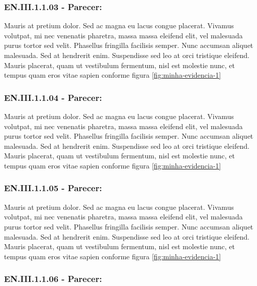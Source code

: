 \documentclass[12pt, a4paper]{article}
\begin{document}
    \subsubsection*{EN.III.1.1.03 - Parecer:}
    
    Mauris at pretium dolor. Sed ac magna eu lacus congue placerat. Vivamus volutpat, mi nec venenatis pharetra, massa massa eleifend elit, vel malesuada purus tortor sed velit. Phasellus fringilla facilisis semper. Nunc accumsan aliquet malesuada. Sed at hendrerit enim. Suspendisse sed leo at orci tristique eleifend. Mauris placerat, quam ut vestibulum fermentum, nisl est molestie nunc, et tempus quam eros vitae sapien  conforme figura \ref{fig:minha-evidencia-1}
    
    \vspace{1cm} 
    
    \subsubsection*{EN.III.1.1.04 - Parecer:}
    
    Mauris at pretium dolor. Sed ac magna eu lacus congue placerat. Vivamus volutpat, mi nec venenatis pharetra, massa massa eleifend elit, vel malesuada purus tortor sed velit. Phasellus fringilla facilisis semper. Nunc accumsan aliquet malesuada. Sed at hendrerit enim. Suspendisse sed leo at orci tristique eleifend. Mauris placerat, quam ut vestibulum fermentum, nisl est molestie nunc, et tempus quam eros vitae sapien  conforme figura \ref{fig:minha-evidencia-1}
    \vspace{1cm} 
    
    \subsubsection*{EN.III.1.1.05 - Parecer:}
    
    Mauris at pretium dolor. Sed ac magna eu lacus congue placerat. Vivamus volutpat, mi nec venenatis pharetra, massa massa eleifend elit, vel malesuada purus tortor sed velit. Phasellus fringilla facilisis semper. Nunc accumsan aliquet malesuada. Sed at hendrerit enim. Suspendisse sed leo at orci tristique eleifend. Mauris placerat, quam ut vestibulum fermentum, nisl est molestie nunc, et tempus quam eros vitae sapien  conforme figura \ref{fig:minha-evidencia-1}
    \vspace{1cm} 
    
    \subsubsection*{EN.III.1.1.06 - Parecer:}
    
\end{document}
